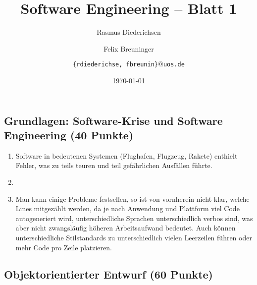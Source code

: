 \documentclass{scrartcl}
\title{\rmfamily Software Engineering -- Blatt 1}
\author{Rasmus Diederichsen \and Felix Breuninger\and %
   \texttt{\{rdiederichse, fbreunin\}$@$uos.de}
}
\date{\today}
\begin{document}
\selectfont
\maketitle


\setcounter{section}{1}
\setcounter{subsection}{1}
\subsection{Grundlagen: Software-Krise und Software Engineering (40 Punkte)}

\begin{enumerate}
   \item Software in bedeutenen Systemen (Flughafen, Flugzeug, Rakete) enthielt
      Fehler, was zu teils teuren und teil gefährlichen Ausfällen führte. %
   \item %
   \item Man kann einige Probleme festsellen, so ist von vornherein nicht klar,
      welche Lines mitgezählt werden, da je nach Anwendung und Plattform viel Code
      autogeneriert wird, unterschiedliche Sprachen unterschiedlich verbos sind,
      was aber nicht zwangsläufig höheren Arbeitsaufwand bedeutet. Auch können
      unterschiedliche Stilstandards zu unterschiedlich vielen Leerzeilen führen
      oder mehr Code pro Zeile platzieren.
\end{enumerate}


\subsection{Objektorientierter Entwurf (60 Punkte)}
\end{document}
